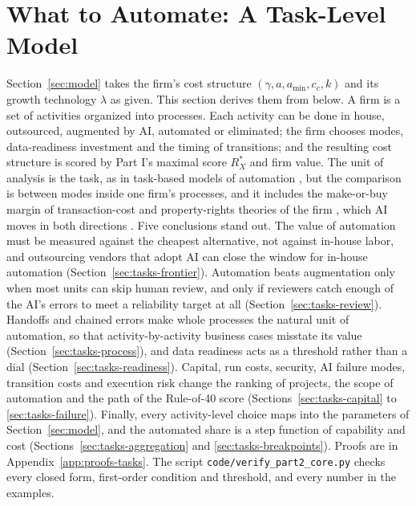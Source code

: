 \section{What to Automate: A Task-Level Model}\label{sec:tasks}\label{sec:core}

Section~\ref{sec:model} takes the firm's cost structure $(\gamma,a,a_{\min},c_c,k)$ and its growth technology $\lambda$ as given. This section derives them from below. A firm is a set of activities organized into processes. Each activity can be done in house, outsourced, augmented by AI, automated or eliminated; the firm chooses modes, data-readiness investment and the timing of transitions; and the resulting cost structure is scored by Part I's maximal score $R_X^*$ and firm value. The unit of analysis is the task, as in task-based models of automation \citep{acemoglu2018race,restrepo2024automation}, but the comparison is between modes inside one firm's processes, and it includes the make-or-buy margin of transaction-cost and property-rights theories of the firm \citep{williamson1985economic,grossman1986costs}, which AI moves in both directions \citep{shahidi2025coasean,garicano2026vanishing}. Five conclusions stand out. The value of automation must be measured against the cheapest alternative, not against in-house labor, and outsourcing vendors that adopt AI can close the window for in-house automation (Section~\ref{sec:tasks-frontier}). Automation beats augmentation only when most units can skip human review, and only if reviewers catch enough of the AI's errors to meet a reliability target at all (Section~\ref{sec:tasks-review}). Handoffs and chained errors make whole processes the natural unit of automation, so that activity-by-activity business cases misstate its value (Section~\ref{sec:tasks-process}), and data readiness acts as a threshold rather than a dial (Section~\ref{sec:tasks-readiness}). Capital, run costs, security, AI failure modes, transition costs and execution risk change the ranking of projects, the scope of automation and the path of the Rule-of-40 score (Sections~\ref{sec:tasks-capital} to \ref{sec:tasks-failure}). Finally, every activity-level choice maps into the parameters of Section~\ref{sec:model}, and the automated share is a step function of capability and cost (Sections~\ref{sec:tasks-aggregation} and \ref{sec:tasks-breakpoints}). Proofs are in Appendix~\ref{app:proofs-tasks}. The script \texttt{code/verify\_part2\_core.py} checks every closed form, first-order condition and threshold, and every number in the examples.

